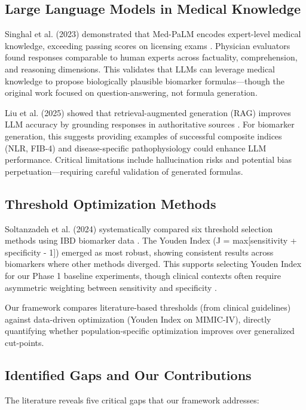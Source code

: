 \documentclass[12pt,a4paper]{article}
\begin{document}
\subsection{Large Language Models in Medical Knowledge}

Singhal et al. (2023) demonstrated that Med-PaLM encodes expert-level medical knowledge, exceeding passing scores on licensing exams \cite{ref17}. Physician evaluators found responses comparable to human experts across factuality, comprehension, and reasoning dimensions. This validates that LLMs can leverage medical knowledge to propose biologically plausible biomarker formulas---though the original work focused on question-answering, not formula generation.

Liu et al. (2025) showed that retrieval-augmented generation (RAG) improves LLM accuracy by grounding responses in authoritative sources \cite{ref18}. For biomarker generation, this suggests providing examples of successful composite indices (NLR, FIB-4) and disease-specific pathophysiology could enhance LLM performance. Critical limitations include hallucination risks and potential bias perpetuation---requiring careful validation of generated formulas.

\subsection{Threshold Optimization Methods}

Soltanzadeh et al. (2024) systematically compared six threshold selection methods using IBD biomarker data \cite{ref19}. The Youden Index (J = max[sensitivity + specificity - 1]) emerged as most robust, showing consistent results across biomarkers where other methods diverged. This supports selecting Youden Index for our Phase 1 baseline experiments, though clinical contexts often require asymmetric weighting between sensitivity and specificity \cite{ref27,ref28}.

Our framework compares literature-based thresholds (from clinical guidelines) against data-driven optimization (Youden Index on MIMIC-IV), directly quantifying whether population-specific optimization improves over generalized cut-points.

\subsection{Identified Gaps and Our Contributions}

The literature reveals five critical gaps that our framework addresses:
\end{document}
